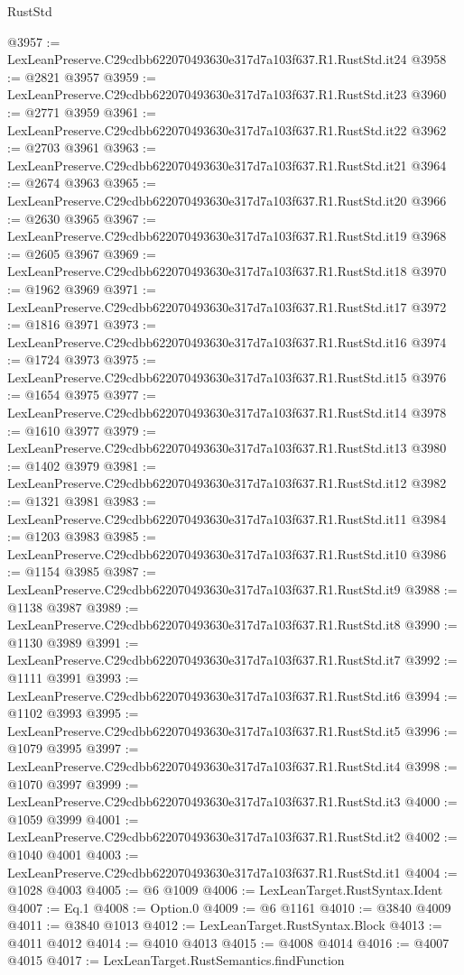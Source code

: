 \begin{lexlean}{RustStd}
\begin{coremodule}
@3957 := LexLeanPreserve.C29cdbb622070493630e317d7a103f637.R1.RustStd.it24
@3958 := @2821 @3957
@3959 := LexLeanPreserve.C29cdbb622070493630e317d7a103f637.R1.RustStd.it23
@3960 := @2771 @3959
@3961 := LexLeanPreserve.C29cdbb622070493630e317d7a103f637.R1.RustStd.it22
@3962 := @2703 @3961
@3963 := LexLeanPreserve.C29cdbb622070493630e317d7a103f637.R1.RustStd.it21
@3964 := @2674 @3963
@3965 := LexLeanPreserve.C29cdbb622070493630e317d7a103f637.R1.RustStd.it20
@3966 := @2630 @3965
@3967 := LexLeanPreserve.C29cdbb622070493630e317d7a103f637.R1.RustStd.it19
@3968 := @2605 @3967
@3969 := LexLeanPreserve.C29cdbb622070493630e317d7a103f637.R1.RustStd.it18
@3970 := @1962 @3969
@3971 := LexLeanPreserve.C29cdbb622070493630e317d7a103f637.R1.RustStd.it17
@3972 := @1816 @3971
@3973 := LexLeanPreserve.C29cdbb622070493630e317d7a103f637.R1.RustStd.it16
@3974 := @1724 @3973
@3975 := LexLeanPreserve.C29cdbb622070493630e317d7a103f637.R1.RustStd.it15
@3976 := @1654 @3975
@3977 := LexLeanPreserve.C29cdbb622070493630e317d7a103f637.R1.RustStd.it14
@3978 := @1610 @3977
@3979 := LexLeanPreserve.C29cdbb622070493630e317d7a103f637.R1.RustStd.it13
@3980 := @1402 @3979
@3981 := LexLeanPreserve.C29cdbb622070493630e317d7a103f637.R1.RustStd.it12
@3982 := @1321 @3981
@3983 := LexLeanPreserve.C29cdbb622070493630e317d7a103f637.R1.RustStd.it11
@3984 := @1203 @3983
@3985 := LexLeanPreserve.C29cdbb622070493630e317d7a103f637.R1.RustStd.it10
@3986 := @1154 @3985
@3987 := LexLeanPreserve.C29cdbb622070493630e317d7a103f637.R1.RustStd.it9
@3988 := @1138 @3987
@3989 := LexLeanPreserve.C29cdbb622070493630e317d7a103f637.R1.RustStd.it8
@3990 := @1130 @3989
@3991 := LexLeanPreserve.C29cdbb622070493630e317d7a103f637.R1.RustStd.it7
@3992 := @1111 @3991
@3993 := LexLeanPreserve.C29cdbb622070493630e317d7a103f637.R1.RustStd.it6
@3994 := @1102 @3993
@3995 := LexLeanPreserve.C29cdbb622070493630e317d7a103f637.R1.RustStd.it5
@3996 := @1079 @3995
@3997 := LexLeanPreserve.C29cdbb622070493630e317d7a103f637.R1.RustStd.it4
@3998 := @1070 @3997
@3999 := LexLeanPreserve.C29cdbb622070493630e317d7a103f637.R1.RustStd.it3
@4000 := @1059 @3999
@4001 := LexLeanPreserve.C29cdbb622070493630e317d7a103f637.R1.RustStd.it2
@4002 := @1040 @4001
@4003 := LexLeanPreserve.C29cdbb622070493630e317d7a103f637.R1.RustStd.it1
@4004 := @1028 @4003
@4005 := @6 @1009
@4006 := LexLeanTarget.RustSyntax.Ident
@4007 := Eq.{1}
@4008 := Option.{0}
@4009 := @6 @1161
@4010 := @3840 @4009
@4011 := @3840 @1013
@4012 := LexLeanTarget.RustSyntax.Block
@4013 := @4011 @4012
@4014 := @4010 @4013
@4015 := @4008 @4014
@4016 := @4007 @4015
@4017 := LexLeanTarget.RustSemantics.findFunction

\end{coremodule}
\end{lexlean}
